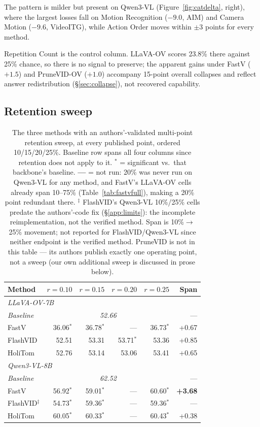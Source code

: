 \documentclass[11pt]{article}
\begin{document}
The pattern is milder but present on Qwen3-VL (Figure~\ref{fig:catdelta},
right), where the largest losses fall on Motion Recognition ($-9.0$, AIM)
and Camera Motion ($-9.6$, VideoITG), while Action Order moves within
$\pm3$ points for every method.

Repetition Count is the control column. LLaVA-OV scores 23.8\% there against
25\% chance, so there is no signal to preserve; the apparent gains under
FastV ($+1.5$) and PruneVID-OV ($+1.0$) accompany 15-point overall collapses
and reflect answer redistribution (\S\ref{sec:collapse}), not recovered
capability.

\subsection{Retention sweep}
\label{sec:retention}

\begin{table}[H]
  \centering
  \small
  \caption{The three methods with an authors'-validated multi-point retention
  sweep, at every published point, ordered 10/15/20/25\%. Baseline row spans
  all four columns since retention does not apply to it. $^{*}$ =
  significant vs.\ that backbone's baseline. \textbf{---} = not run: 20\% was
  never run on Qwen3-VL for any method, and FastV's LLaVA-OV cells already
  span 10--75\% (Table~\ref{tab:fastvfull}), making a 20\% point redundant
  there. $^{\ddagger}$ FlashVID's Qwen3-VL 10\%/25\% cells predate the
  authors'-code fix (\S\ref{app:limits}): the incomplete reimplementation, not
  the verified method. Span is 10\%$\to$25\% movement; not reported for
  FlashVID/Qwen3-VL since neither endpoint is the verified method. PruneVID
  is not in this table --- its authors publish exactly one operating point,
  not a sweep (our own additional sweep is discussed in prose below).}
  \label{tab:retention}
  \begin{tabular}{lrrrrr}
    \toprule
    Method & $r=0.10$ & $r=0.15$ & $r=0.20$ & $r=0.25$ & Span \\
    \midrule
    \multicolumn{6}{l}{\textit{LLaVA-OV-7B}} \\
    \textit{Baseline} & \multicolumn{4}{c}{\textit{52.66}} & --- \\
    FastV & 36.06$^{*}$ & 36.78$^{*}$ & --- & 36.73$^{*}$ & +0.67 \\
    FlashVID & 52.51 & 53.31 & 53.71$^{*}$ & 53.36 & +0.85 \\
    HoliTom & 52.76 & 53.14 & 53.06 & 53.41 & +0.65 \\
    \midrule
    \multicolumn{6}{l}{\textit{Qwen3-VL-8B}} \\
    \textit{Baseline} & \multicolumn{4}{c}{\textit{62.52}} & --- \\
    FastV & 56.92$^{*}$ & 59.01$^{*}$ & --- & 60.60$^{*}$ & \textbf{+3.68} \\
    FlashVID$^{\ddagger}$ & 54.73$^{*}$ & 59.36$^{*}$ & --- & 59.36$^{*}$ & --- \\
    HoliTom & 60.05$^{*}$ & 60.33$^{*}$ & --- & 60.43$^{*}$ & +0.38 \\
    \bottomrule
  \end{tabular}
\end{table}
\end{document}
